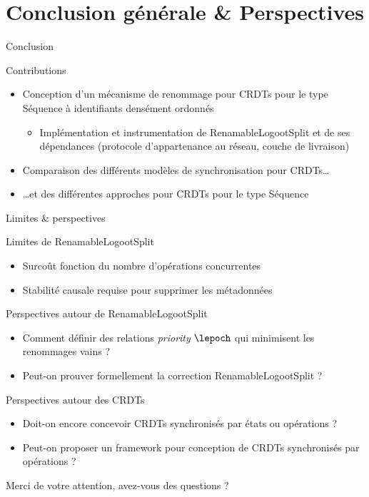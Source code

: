 \section{Conclusion générale \& Perspectives}

\begin{frame}{Conclusion}
  \begin{block}{Contributions}
    \begin{itemize}
      \item Conception d'un mécanisme de renommage pour CRDTs pour le type Séquence à identifiants densément ordonnés
      \begin{itemize}
        \item Implémentation et instrumentation de RenamableLogootSplit et de ses dépendances (protocole d'appartenance au réseau, couche de livraison)
      \end{itemize}
      \pause
      \item Comparaison des différents modèles de synchronisation pour CRDTs\dots
      \item \dots et des différentes approches pour CRDTs pour le type Séquence
    \end{itemize}
  \end{block}
\end{frame}

\begin{frame}{Limites \& perspectives}
  \begin{block}{Limites de RenamableLogootSplit}
    \begin{itemize}
      \item Surcoût fonction du nombre d'opérations \ren concurrentes
      \item Stabilité causale requise pour supprimer les métadonnées
    \end{itemize}
  \end{block}
  \begin{block}{Perspectives autour de RenamableLogootSplit}
    \begin{itemize}
      \item Comment définir des relations \emph{priority} $\lepoch$ qui minimisent les renommages vains ?
      \item Peut-on prouver formellement la correction RenamableLogootSplit ?
    \end{itemize}
  \end{block}
  \pause
  \begin{block}{Perspectives autour des CRDTs}
    \begin{itemize}
      \item Doit-on encore concevoir CRDTs synchronisés par états ou opérations ?
      \item Peut-on proposer un framework pour conception de CRDTs synchronisés par opérations ?
    \end{itemize}
  \end{block}
\end{frame}

\begin{frame}[standout]
  Merci de votre attention, avez-vous des questions ?
  \vspace{3em}
  \begin{center}
    \ccby
  \end{center}
\end{frame}
